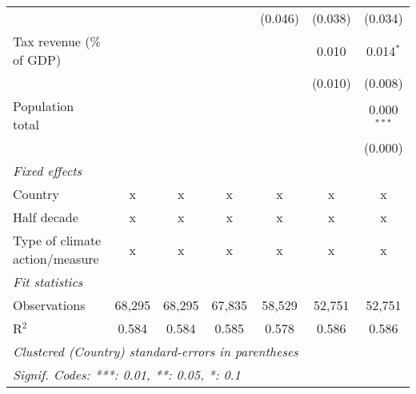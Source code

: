 \begin{tabular}{lcccccc}
                                                     &         &                &                & (0.046)        & (0.038)        & (0.034)\\   
   Tax revenue (\% of GDP)                           &         &                &                &                & 0.010          & 0.014$^{*}$\\   
                                                     &         &                &                &                & (0.010)        & (0.008)\\   
   Population total                                  &         &                &                &                &                & 0.000$^{***}$\\   
                                                     &         &                &                &                &                & (0.000)\\   
   \emph{Fixed effects}\\
   Country                                           & x       & x              & x              & x              & x              & x\\  
   Half decade                                       & x       & x              & x              & x              & x              & x\\  
   Type of climate action/measure                    & x       & x              & x              & x              & x              & x\\  
   \midrule \emph{Fit statistics}\\
   Observations                                      & 68,295  & 68,295         & 67,835         & 58,529         & 52,751         & 52,751\\  
   R$^2$                                             & 0.584   & 0.584          & 0.585          & 0.578          & 0.586          & 0.586\\  
   \midrule
   \multicolumn{7}{l}{\emph{Clustered (Country) standard-errors in parentheses}}\\
   \multicolumn{7}{l}{\emph{Signif. Codes: ***: 0.01, **: 0.05, *: 0.1}}\\
\end{tabular}
\par\endgroup


